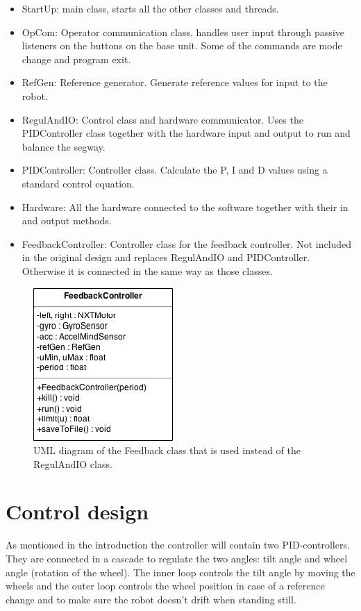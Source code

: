 \documentclass[a4paper]{article}
\begin{document}
\begin{itemize}
\item StartUp: main class, starts all the other classes and threads.
\item OpCom: Operator communication class, handles user input through passive listeners on the buttons on the base unit. Some of the commands are mode change and program exit.
\item RefGen: Reference generator. Generate reference values for input to the robot.
\item RegulAndIO: Control class and hardware communicator. Uses the PIDController class together with the hardware input and output to run and balance the segway.
\item PIDController: Controller class. Calculate the P, I and D values using a standard control equation.
\item Hardware: All the hardware connected to the software together with their in and output methods.
\item FeedbackController: Controller class for the feedback controller. Not included in the original design and replaces RegulAndIO and PIDController. Otherwise it is connected in the same way as those classes.
\end{itemize}

\begin{figure}[H]
 \centering
\includegraphics[scale=1]{pic/FeedbackClass.png}
\caption{UML diagram of the Feedback class that is used instead of the RegulAndIO class.}
\end{figure}

\section{Control design}
As mentioned in the introduction the controller will contain two PID-controllers. They are connected in a cascade to regulate the two angles: tilt angle and wheel angle (rotation of the wheel). The inner loop controls the tilt angle by moving the wheels and the outer loop controls the wheel position in case of a reference change and to make sure the robot doesn't drift when standing still.
\end{document}
